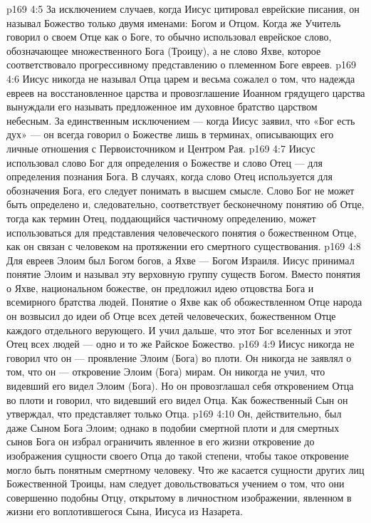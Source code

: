 \vs p169 4:5 \pc За исключением случаев, когда Иисус цитировал еврейские писания, он называл Божество только двумя именами: Богом и Отцом. Когда же Учитель говорил о своем Отце как о Боге, то обычно использовал еврейское слово, обозначающее множественного Бога (Троицу), а не слово Яхве, которое соответствовало прогрессивному представлению о племенном Боге евреев.
\vs p169 4:6 Иисус никогда не называл Отца царем и весьма сожалел о том, что надежда евреев на восстановленное царства и провозглашение Иоанном грядущего царства вынуждали его называть предложенное им духовное братство царством небесным. За единственным исключением --- когда Иисус заявил, что «Бог есть дух» --- он всегда говорил о Божестве лишь в терминах, описывающих его личные отношения с Первоисточником и Центром Рая.
\vs p169 4:7 Иисус использовал слово Бог для определения  о Божестве и слово Отец --- для определения  познания Бога. В случаях, когда слово Отец используется для обозначения Бога, его следует понимать в высшем смысле. Слово Бог не может быть определено и, следовательно, соответствует бесконечному понятию об Отце, тогда как термин Отец, поддающийся частичному определению, может использоваться для представления человеческого понятия о божественном Отце, как он связан с человеком на протяжении его смертного существования.
\vs p169 4:8 Для евреев Элоим был Богом богов, а Яхве --- Богом Израиля. Иисус принимал понятие Элоим и называл эту верховную группу существ Богом. Вместо понятия о Яхве, национальном божестве, он предложил идею отцовства Бога и всемирного братства людей. Понятие о Яхве как об обожествленном Отце народа он возвысил до идеи об Отце всех детей человеческих, божественном Отце каждого отдельного верующего. И учил дальше, что этот Бог вселенных и этот Отец всех людей --- одно и то же Райское Божество.
\vs p169 4:9 Иисус никогда не говорил что он --- проявление Элоим (Бога) во плоти. Он никогда не заявлял о том, что он --- откровение Элоим (Бога) мирам. Он никогда не учил, что видевший его видел Элоим (Бога). Но он провозглашал себя откровением Отца во плоти и говорил, что видевший его видел Отца. Как божественный Сын он утверждал, что представляет только Отца.
\vs p169 4:10 Он, действительно, был даже Сыном Бога Элоим; однако в подобии смертной плоти и для смертных сынов Бога он избрал ограничить явленное в его жизни откровение до изображения сущности своего Отца до такой степени, чтобы такое откровение могло быть понятным смертному человеку. Что же касается сущности других лиц Божественной Троицы, нам следует довольствоваться учением о том, что они совершенно подобны Отцу, открытому в личностном изображении, явленном в жизни его воплотившегося Сына, Иисуса из Назарета.

